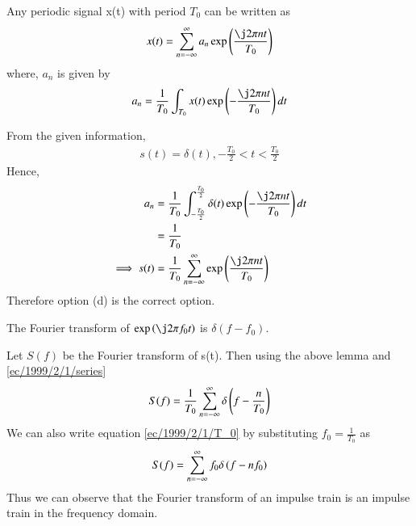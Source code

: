 
\begin{lemma}
Any periodic signal x(t) with period $T_0$ can be written as 
\begin{equation}
    x(t) = \sum_{n=-\infty}^{\infty} a_n \exp \brak{\frac{\j2\pi nt}{T_0}}\label{ec/1999/2/1/analysis}
\end{equation}
where, $a_n$ is given by
\begin{equation}
    a_n = \frac{1}{T_0}\int_{T_0}x(t)\exp\brak{-\frac{\j2\pi nt}{T_0}}dt\label{ec/1999/2/1/synthesis}
\end{equation}
\end{lemma}
From the given information,
\begin{align}
s(t) = \delta(t), -\frac{T_0}{2} < t < \frac{T_0}{2}
\end{align}
Hence, 
\begin{align}
a_n &= \frac{1}{T_0}\int_{-\frac{T_0}{2}}^{\frac{T_0}{2}}\delta(t)\exp\brak{-\frac{\j2\pi nt}{T_0}}dt\\
        &= \frac{1}{T_0}\\
    \implies s(t) &= \frac{1}{T_0}\sum_{n=-\infty}^{\infty}\exp\brak{\frac{\j2\pi nt}{T_0}}\label{ec/1999/2/1/series}
\end{align}
Therefore option (d) is the correct option.
\begin{lemma}
The Fourier transform of $\exp \brak{\j2\pi f_0t}$ is $\delta(f-f_0)$.
\end{lemma}
Let $S(f)$ be the Fourier transform of s(t). Then using the above lemma and  \eqref{ec/1999/2/1/series}
\begin{equation}
    S(f) = \frac{1}{T_0}\sum_{n=-\infty}^{\infty}\delta\left(f-\frac{n}{T_0}\right)\label{ec/1999/2/1/T_0}
\end{equation}
We can also write equation \eqref{ec/1999/2/1/T_0} by substituting $f_0 = \frac{1}{T_0}$ as
\begin{equation}
    S(f) = \sum_{n=-\infty}^{\infty}f_0\delta\left(f-nf_0\right)
\end{equation}
Thus we can observe that the Fourier transform of an impulse train is an impulse train in the frequency domain.
